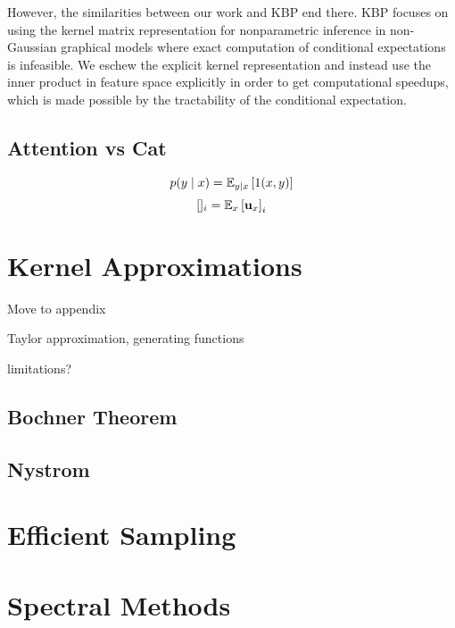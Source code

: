 \documentclass{article}
\begin{document}
However, the similarities between our work and KBP end there.
KBP focuses on using the kernel matrix representation for nonparametric inference
in non-Gaussian graphical models where exact computation of conditional expectations is
infeasible.
We eschew the explicit kernel representation and
instead use the inner product in feature space explicitly in order to get
computational speedups,
which is made possible by the tractability of the conditional expectation.


\subsection{Attention vs Cat}
$$p(y\mid x) = \mathbb{E}_{y\mid x}\left[1(x,y)\right]$$
$$[]_i = \mathbb{E}_{x}\left[\mathbf{u}_x\right]_i$$


\section{Kernel Approximations}
Move to appendix

Taylor approximation, generating functions

limitations?
\subsection{Bochner Theorem}
\subsection{Nystrom}

\section{Efficient Sampling}

\section{Spectral Methods}



\end{document}
